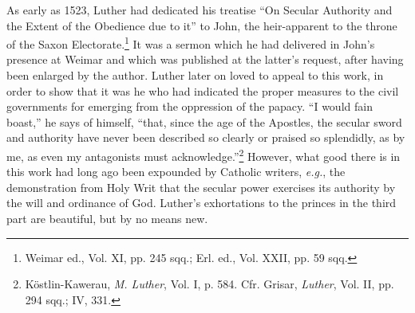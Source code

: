 As early as 1523, Luther had dedicated his treatise “On Secular
Authority and the Extent of the Obedience due to it” to John, the
heir-apparent to the throne of the Saxon Electorate.\footnote
{Weimar ed., Vol. XI, pp. 245 sqq.; Erl. ed., Vol. XXII, pp. 59 sqq.}
It was a
sermon which he had delivered in John’s presence at Weimar and
which was published at the latter’s request, after having been enlarged
by the author. Luther later on loved to appeal to this work,
in order to show that it was he who had indicated the proper measures
to the civil governments for emerging from the oppression of the
papacy. “I would fain boast,” he says of himself, “that, since the age
of the Apostles, the secular sword and authority have never been
described so clearly or praised so splendidly, as by me, as even my antagonists
must acknowledge.”\footnote
{Köstlin-Kawerau, \textit{M. Luther}, Vol. I, p. 584. Cfr. Grisar, \textit{Luther}, Vol. II, pp. 294 sqq.;
IV, 331.}
However, what good there is in this
work had long ago been expounded by Catholic writers, \textit{e.g.}, the
demonstration from Holy Writ that the secular power exercises its
authority by the will and ordinance of God. Luther’s exhortations to
the princes in the third part are beautiful, but by no means new.

